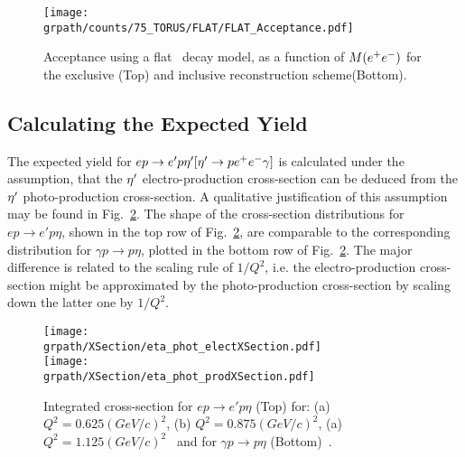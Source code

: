  \begin{figure}[h!]\begin{center}
 		\texttt{[image: \\grpath/counts/75\_TORUS/FLAT/FLAT\_Acceptance.pdf]}
 		\caption[Acceptance, as a function of $M(\epem)$]{\label{fig:FLATaccepted}{Acceptance using a flat \epemT \ decay model, as a function of $M(\epem)$ for the exclusive (Top) and inclusive reconstruction scheme(Bottom).}}
 \end{center}\end{figure} 
\FloatBarrier





\subsection{Calculating the Expected Yield}

The expected yield for $ep\to e'p \eta^{\prime} [\eta^{\prime}\rightarrow p e^+e^- \gamma ]$ is calculated under the assumption, that the $\eta^{\prime}$ electro-production cross-section can be deduced from the $\eta^{\prime}$ photo-production cross-section. A qualitative justification of this assumption may be found in Fig.~\ref{fig:EtaProdX}. The shape of the cross-section distributions for $ep\rightarrow e'p\eta$, shown in the top row of Fig.~\ref{fig:EtaProdX}, are comparable to the corresponding distribution for $\gamma p\rightarrow p\eta$, plotted in the bottom row of Fig.~\ref{fig:EtaProdX}. The major difference is related to the scaling rule of $1/Q^2$, i.e. the electro-production cross-section might be approximated by the photo-production cross-section by scaling down the latter one by $1/Q^2$.

\begin{figure}[htbp]\begin{center}
		\texttt{[image: \\grpath/XSection/eta\_phot\_electXSection.pdf]}\\
		\texttt{[image: \\grpath/XSection/eta\_phot\_prodXSection.pdf]}
		\caption[eta el-prod. XSection]{\label{fig:EtaProdX}{Integrated cross-section for $ep\to e'p\eta$ (Top) for: (a) $Q^2=0.625(GeV/c)^2$, (b) $Q^2=0.875(GeV/c)^2$, (a) $Q^2=1.125(GeV/c)^2$~\cite{etaelect} and for $\gamma p\rightarrow p\eta$ (Bottom)~\cite{etaphoto}.}}
\end{center}\end{figure}

